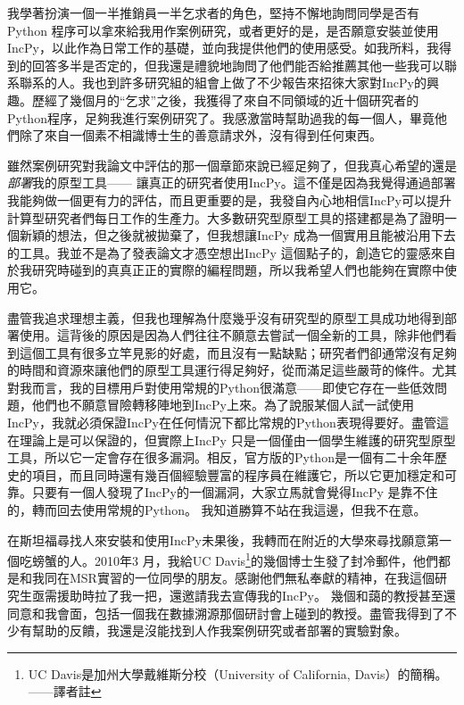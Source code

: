 \documentclass[12pt,UTF8,nofonts]{book}
\begin{document}
我學著扮演一個一半推銷員一半乞求者的角色，堅持不懈地詢問同學是否有Python 程序可以拿來給我用作案例研究，或者更好的是，是否願意安裝並使用IncPy，以此作為日常工作的基礎，並向我提供他們的使用感受。如我所料，我得到的回答多半是否定的，但我還是禮貌地詢問了他們能否給推薦其他一些我可以聯系聯系的人。我也到許多研究組的組會上做了不少報告來招徠大家對IncPy的興趣。歷經了幾個月的“乞求”之後，我獲得了來自不同領域的近十個研究者的Python程序，足夠我進行案例研究了。我感激當時幫助過我的每一個人，畢竟他們除了來自一個素不相識博士生的善意請求外，沒有得到任何東西。

\breakline

雖然案例研究對我論文中評估的那一個章節來說已經足夠了，但我真心希望的還是\emph{部署}我的原型工具—— 讓真正的研究者使用IncPy。這不僅是因為我覺得通過部署我能夠做一個更有力的評估，而且更重要的是，我發自內心地相信IncPy可以提升計算型研究者們每日工作的生產力。大多數研究型原型工具的搭建都是為了證明一個新穎的想法，但之後就被拋棄了，但我想讓IncPy 成為一個實用且能被沿用下去的工具。我並不是為了發表論文才憑空想出IncPy 這個點子的，創造它的靈感來自於我研究時碰到的真真正正的實際的編程問題，所以我希望人們也能夠在實際中使用它。

盡管我追求理想主義，但我也理解為什麼幾乎沒有研究型的原型工具成功地得到部署使用。這背後的原因是因為人們往往不願意去嘗試一個全新的工具，除非他們看到這個工具有很多立竿見影的好處，而且沒有一點缺點；研究者們卻通常沒有足夠的時間和資源來讓他們的原型工具運行得足夠好，從而滿足這些嚴苛的條件。尤其對我而言，我的目標用戶對使用常規的Python很滿意——即使它存在一些低效問題，他們也不願意冒險轉移陣地到IncPy上來。為了說服某個人試一試使用IncPy，我就必須保證IncPy在任何情況下都比常規的Python表現得要好。盡管這在理論上是可以保證的，但實際上IncPy 只是一個僅由一個學生維護的研究型原型工具，所以它一定會存在很多漏洞。相反，官方版的Python是一個有二十余年歷史的項目，而且同時還有幾百個經驗豐富的程序員在維護它，所以它更加穩定和可靠。只要有一個人發現了IncPy的一個漏洞，大家立馬就會覺得IncPy 是靠不住的，轉而回去使用常規的Python。 我知道勝算不站在我這邊，但我不在意。

在斯坦福尋找人來安裝和使用IncPy未果後，我轉而在附近的大學來尋找願意第一個吃螃蟹的人。2010年3 月，我給UC Davis\footnote{UC Davis是加州大學戴維斯分校（University of California, Davis）的簡稱。——譯者註}的幾個博士生發了封冷郵件，他們都是和我同在MSR實習的一位同學的朋友。感謝他們無私奉獻的精神，在我這個研究生亟需援助時拉了我一把，還邀請我去宣傳我的IncPy。 幾個和藹的教授甚至還同意和我會面，包括一個我在數據溯源那個研討會上碰到的教授。盡管我得到了不少有幫助的反饋，我還是沒能找到人作我案例研究或者部署的實驗對象。
\end{document}
